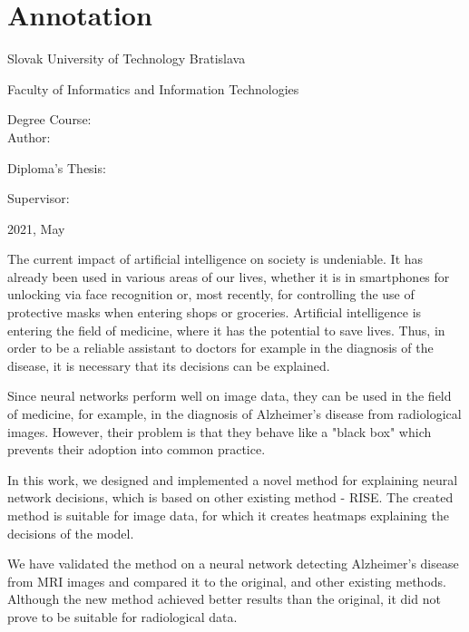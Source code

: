 
\thispagestyle{empty}

\section*{Annotation}

\begin{minipage}[t]{1\columnwidth}%
Slovak University of Technology Bratislava 

Faculty of Informatics and Information Technologies

Degree Course: \myStudyProgramEng\\

Author: \myName

Diploma's Thesis: \myTitleEng

Supervisor: \mySupervisorEng

2021, May
\end{minipage}

\bigskip{}

The current impact of artificial intelligence on society is undeniable. It has already been used in various areas of our lives, whether it is in smartphones for unlocking via face recognition or, most recently, for controlling the use of protective masks when entering shops or groceries. Artificial intelligence is entering the field of medicine, where it has the potential to save lives. Thus, in order to be a reliable assistant to doctors for example in the diagnosis of the disease, it is necessary that its decisions can be explained.

Since neural networks perform well on image data, they can be used in the field of medicine, for example, in the diagnosis of Alzheimer's disease from radiological images. However, their problem is that they behave like a "black box" which prevents their adoption into common practice.

In this work, we designed and implemented a novel method for explaining neural network decisions, which is based on other existing method - RISE. The created method is suitable for image data, for which it creates heatmaps explaining the decisions of the model.

We have validated the method on a neural network detecting Alzheimer's disease from MRI images and compared it to the original, and other existing methods. Although the new method achieved better results than the original, it did not prove to be suitable for radiological data.

\newpage
\thispagestyle{empty}
\mbox{}
\newpage